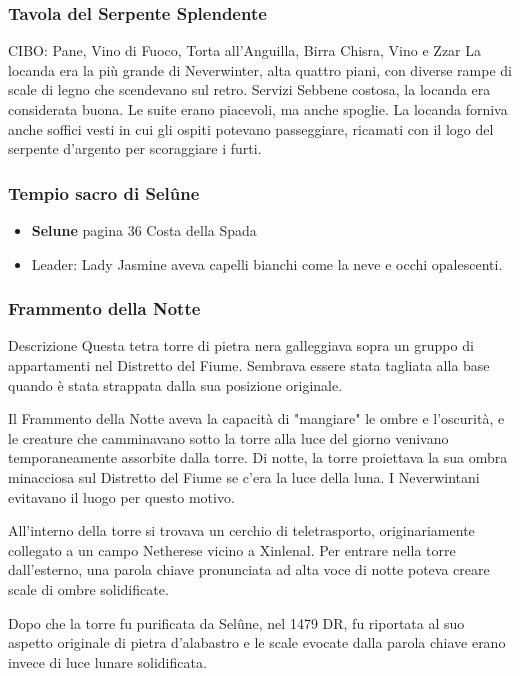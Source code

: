 \documentclass{article}
\begin{document}
              \subsubsection{Tavola del Serpente Splendente}
CIBO: Pane, Vino di Fuoco, Torta all'Anguilla, Birra Chisra, Vino e Zzar\newline
La locanda era la più grande di Neverwinter, alta quattro piani, con diverse rampe di scale di legno che scendevano sul retro. Servizi Sebbene costosa, la locanda era considerata buona. Le suite erano piacevoli, ma anche spoglie. La locanda forniva anche soffici vesti in cui gli ospiti potevano passeggiare, ricamati con il logo del serpente d'argento per scoraggiare i furti.
              \subsubsection{Tempio sacro di Selûne}
\begin{itemize}
    \item \textbf{Selune} pagina 36 Costa della Spada
    \item Leader: Lady Jasmine aveva capelli bianchi come la neve e occhi opalescenti.
\end{itemize}
              \subsubsection{Frammento della Notte}
Descrizione\newline
Questa tetra torre di pietra nera galleggiava sopra un gruppo di appartamenti nel Distretto del Fiume. Sembrava essere stata tagliata alla base quando è stata strappata dalla sua posizione originale.

Il Frammento della Notte aveva la capacità di "mangiare" le ombre e l'oscurità, e le creature che camminavano sotto la torre alla luce del giorno venivano temporaneamente assorbite dalla torre. Di notte, la torre proiettava la sua ombra minacciosa sul Distretto del Fiume se c'era la luce della luna. I Neverwintani evitavano il luogo per questo motivo.

All'interno della torre si trovava un cerchio di teletrasporto, originariamente collegato a un campo Netherese vicino a Xinlenal. Per entrare nella torre dall'esterno, una parola chiave pronunciata ad alta voce di notte poteva creare scale di ombre solidificate.

Dopo che la torre fu purificata da Selûne, nel 1479 DR, fu riportata al suo aspetto originale di pietra d'alabastro e le scale evocate dalla parola chiave erano invece di luce lunare solidificata.
\end{document}

